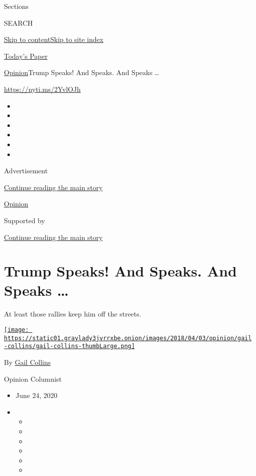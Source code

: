Sections

SEARCH

\protect\hyperlink{site-content}{Skip to
content}\protect\hyperlink{site-index}{Skip to site index}

\href{https://myaccount.nytimes3xbfgragh.onion/auth/login?response_type=cookie\&client_id=vi}{}

\href{https://www.nytimes3xbfgragh.onion/section/todayspaper}{Today's
Paper}

\href{/section/opinion}{Opinion}\textbar{}Trump Speaks! And Speaks. And
Speaks \ldots{}

\url{https://nyti.ms/2YvlOJh}

\begin{itemize}
\item
\item
\item
\item
\item
\item
\end{itemize}

Advertisement

\protect\hyperlink{after-top}{Continue reading the main story}

\href{/section/opinion}{Opinion}

Supported by

\protect\hyperlink{after-sponsor}{Continue reading the main story}

\hypertarget{trump-speaks-and-speaks-and-speaks-}{%
\section{Trump Speaks! And Speaks. And Speaks
\ldots{}}\label{trump-speaks-and-speaks-and-speaks-}}

At least those rallies keep him off the streets.

\href{https://www.nytimes3xbfgragh.onion/by/gail-collins}{\texttt{[image: https://static01.graylady3jvrrxbe.onion/images/2018/04/03/opinion/gail-collins/gail-collins-thumbLarge.png]}}

By \href{https://www.nytimes3xbfgragh.onion/by/gail-collins}{Gail
Collins}

Opinion Columnist

\begin{itemize}
\item
  June 24, 2020
\item
  \begin{itemize}
  \item
  \item
  \item
  \item
  \item
  \item
  \end{itemize}
\end{itemize}

